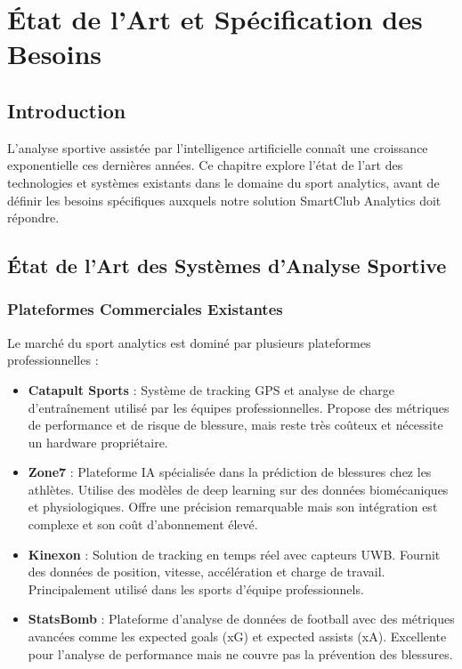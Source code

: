 \chapter{État de l'Art et Spécification des Besoins}

\section{Introduction}

L'analyse sportive assistée par l'intelligence artificielle connaît une croissance exponentielle ces dernières années. Ce chapitre explore l'état de l'art des technologies et systèmes existants dans le domaine du sport analytics, avant de définir les besoins spécifiques auxquels notre solution SmartClub Analytics doit répondre.

\section{État de l'Art des Systèmes d'Analyse Sportive}

\subsection{Plateformes Commerciales Existantes}

Le marché du sport analytics est dominé par plusieurs plateformes professionnelles :

\begin{itemize}
    \item \textbf{Catapult Sports} : Système de tracking GPS et analyse de charge d'entraînement utilisé par les équipes professionnelles. Propose des métriques de performance et de risque de blessure, mais reste très coûteux et nécessite un hardware propriétaire.
    
    \item \textbf{Zone7} : Plateforme IA spécialisée dans la prédiction de blessures chez les athlètes. Utilise des modèles de deep learning sur des données biomécaniques et physiologiques. Offre une précision remarquable mais son intégration est complexe et son coût d'abonnement élevé.
    
    \item \textbf{Kinexon} : Solution de tracking en temps réel avec capteurs UWB. Fournit des données de position, vitesse, accélération et charge de travail. Principalement utilisé dans les sports d'équipe professionnels.
    
    \item \textbf{StatsBomb} : Plateforme d'analyse de données de football avec des métriques avancées comme les expected goals (xG) et expected assists (xA). Excellente pour l'analyse de performance mais ne couvre pas la prévention des blessures.
\end{itemize}

